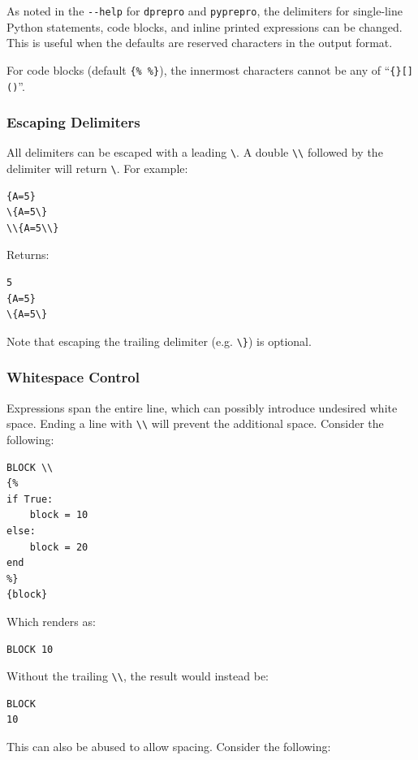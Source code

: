 {As noted in the \texttt{-\/-help} for \texttt{dprepro} and \texttt{pyprepro},
the delimiters for single-line Python statements, code blocks, and inline 
printed expressions can be changed. This is useful when the defaults are 
reserved characters in the output format.

For code blocks (default \texttt{\{\%\ \%\}}), the innermost characters
cannot be any of ``\texttt{\{\}{[}{]}()}''.

\subsubsection{Escaping Delimiters}\label{interfaces:escaping-delimiters}

All delimiters can be escaped with a leading \texttt{\textbackslash{}}.
A double \texttt{\textbackslash{}\textbackslash{}} followed by the
delimiter will return \texttt{\textbackslash{}}. For example:

\begin{verbatim}
{A=5}
\{A=5\}
\\{A=5\\}
\end{verbatim}

Returns:

\begin{verbatim}
5
{A=5}
\{A=5\}  
\end{verbatim}

Note that escaping the trailing delimiter (e.g.
\texttt{\textbackslash{}\}}) is optional.

\subsubsection{Whitespace Control}\label{interfaces:whitespace-control}

Expressions span the entire line, which can possibly introduce undesired white space. 
Ending a line with \texttt{\textbackslash\textbackslash} will prevent the additional space. Consider the following:
\begin{verbatim}
BLOCK \\
{%
if True:
    block = 10
else:
    block = 20
end
%}
{block}
\end{verbatim}

Which renders as:
\begin{verbatim}
BLOCK 10
\end{verbatim}

Without the trailing \texttt{\textbackslash\textbackslash}, the result would instead be:
\begin{verbatim}
BLOCK
10
\end{verbatim}
This can also be abused to allow spacing. Consider the following:

}
